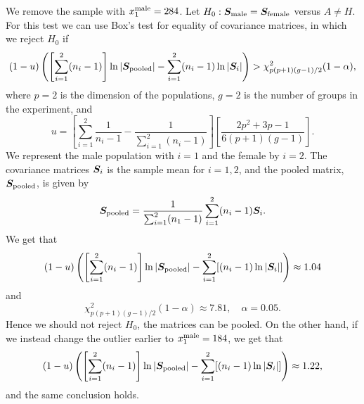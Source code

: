 We remove the sample with $x^{\rm male}_{1} = 284$.
Let $H_{0}: \bm{S}_{\rm male} = \bm{S}_{\rm female}$ versus $A \neq
H$. For this test we can use Box's test for equality of covariance
matrices, in which we reject $H_{0}$ if 
\begin{equation*}\label{eq:boxcorrection}
  (1 - u)
  \left(
    \left[
      \sum_{i=1}^{2}(n_{i} - 1)
    \right]
    \ln \left| \bm{S}_{\rm pooled} \right| - \sum_{i=1}^{2}(n_{i}-1) \ln \left| \bm{S}_{i} \right|
  \right) > \chi^{2}_{p(p+1)(g-1)/2}(1-\alpha),
\end{equation*}
where $p=2$ is the dimension of the populations, $g = 2$ is the
number of groups in the experiment, and
\begin{equation*}
  u = 
  \left[
    \sum_{i=1}^{2}\frac{1}{n_{i}-1} - \frac{1}{\sum_{i=1}^{2}(n_{i}-1)}
  \right]
  \left[
    \frac{2p^{2} + 3p - 1}{6(p+1)(g-1)}
  \right].
\end{equation*}
We represent the male population with $i=1$ and the female by
$i=2$. The covariance matrices $\bm{S}_{i}$ is the sample mean for $i =
1,2$, and the pooled matrix, $\bm{S}_{\rm pooled}$, is given by 
\begin{equation*}
  \bm{S}_{\rm pooled}=  \frac{1}{\sum_{i=1}^{2}(n_{1} -
    1)}\sum_{i=1}^{2}(n_{i}-1)\bm{S}_{i}  .
\end{equation*}
We get that 
\begin{equation*}
    (1 - u)
  \left(
    \left[
      \sum_{i=1}^{2}(n_{i} - 1)
    \right]
    \ln \left| \bm{S}_{\rm pooled} \right| - \sum_{i=1}^{2}[(n_{i}-1) \ln \left| \bm{S}_{i} \right|]
  \right) \approx 1.04
\end{equation*}
and
\begin{equation*}
  \chi^{2}_{p(p+1)(g-1)/2}(1-\alpha) \approx 7.81 , \quad \alpha =0.05.
\end{equation*}
Hence we should not reject $H_{0}$, the matrices can be pooled. On the
other hand, if we  instead change the outlier earlier to
$x_{1}^{\rm male} = 184$, we get that 
\begin{equation*}
    (1 - u)
  \left(
    \left[
      \sum_{i=1}^{2}(n_{i} - 1)
    \right]
    \ln \left| \bm{S}_{\rm pooled} \right| - \sum_{i=1}^{2}[(n_{i}-1) \ln \left| \bm{S}_{i} \right|]
  \right) \approx 1.22,
\end{equation*}
and the same conclusion holds.
